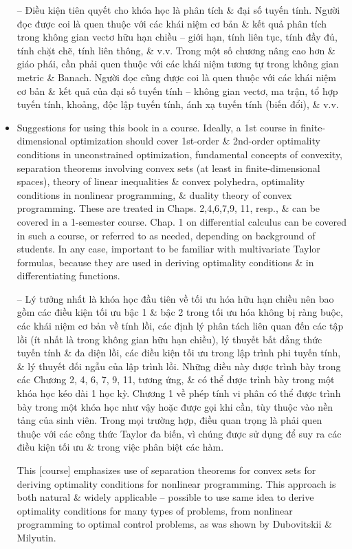 \documentclass{article}
\begin{document}
\begin{itemize}
    -- Điều kiện tiên quyết cho khóa học là phân tích \& đại số tuyến tính. Người đọc được coi là quen thuộc với các khái niệm cơ bản \& kết quả phân tích trong không gian vectơ hữu hạn chiều -- giới hạn, tính liên tục, tính đầy đủ, tính chặt chẽ, tính liên thông, \& v.v. Trong một số chương nâng cao hơn \& giáo phái, cần phải quen thuộc với các khái niệm tương tự trong không gian metric \& Banach. Người đọc cũng được coi là quen thuộc với các khái niệm cơ bản \& kết quả của đại số tuyến tính -- không gian vectơ, ma trận, tổ hợp tuyến tính, khoảng, độc lập tuyến tính, ánh xạ tuyến tính (biến đổi), \& v.v.
    \item {\sf Suggestions for using this book in a course.} Ideally, a 1st course in finite-dimensional optimization should cover 1st-order \& 2nd-order optimality conditions in unconstrained optimization, fundamental concepts of convexity, separation theorems involving convex sets (at least in finite-dimensional spaces), theory of linear inequalities \& convex polyhedra, optimality conditions in nonlinear programming, \& duality theory of convex programming. These are treated in Chaps. 2,4,6,7,9, 11, resp., \& can be covered in a 1-semester course. Chap. 1 on differential calculus can be covered in such a course, or referred to as needed, depending on background of students. In any case, important to be familiar with multivariate Taylor formulas, because they are used in deriving optimality conditions \& in differentiating functions.
    
    -- Lý tưởng nhất là khóa học đầu tiên về tối ưu hóa hữu hạn chiều nên bao gồm các điều kiện tối ưu bậc 1 \& bậc 2 trong tối ưu hóa không bị ràng buộc, các khái niệm cơ bản về tính lồi, các định lý phân tách liên quan đến các tập lồi (ít nhất là trong không gian hữu hạn chiều), lý thuyết bất đẳng thức tuyến tính \& đa diện lồi, các điều kiện tối ưu trong lập trình phi tuyến tính, \& lý thuyết đối ngẫu của lập trình lồi. Những điều này được trình bày trong các Chương 2, 4, 6, 7, 9, 11, tương ứng, \& có thể được trình bày trong một khóa học kéo dài 1 học kỳ. Chương 1 về phép tính vi phân có thể được trình bày trong một khóa học như vậy hoặc được gọi khi cần, tùy thuộc vào nền tảng của sinh viên. Trong mọi trường hợp, điều quan trọng là phải quen thuộc với các công thức Taylor đa biến, vì chúng được sử dụng để suy ra các điều kiện tối ưu \& trong việc phân biệt các hàm.
    
    This [course] emphasizes use of separation theorems for convex sets for deriving optimality conditions for nonlinear programming. This approach is both natural \& widely applicable -- possible to use same idea to derive optimality conditions for many types of problems, from nonlinear programming to optimal control problems, as was shown by {\sc Dubovitskii \& Milyutin}.
    

\end{itemize}
\end{document}
